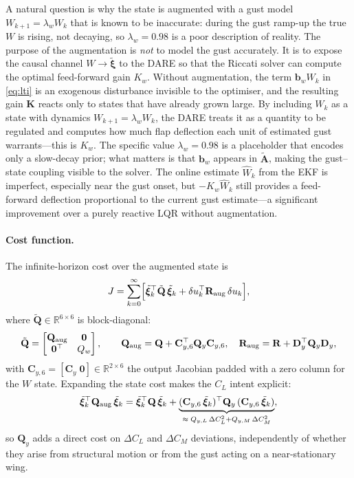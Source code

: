 \documentclass[11pt,a4paper]{article}
\newcommand{\vxi}{\bm{\xi}}
\newcommand{\mA}{\mathbf{A}}
\newcommand{\mC}{\mathbf{C}}
\newcommand{\mD}{\mathbf{D}}
\newcommand{\mK}{\mathbf{K}}
\newcommand{\mQ}{\mathbf{Q}}
\newcommand{\mR}{\mathbf{R}}
\begin{document}
A natural question is why the state is augmented with a gust model
$W_{k+1} = \lambda_w W_k$ that is known to be inaccurate: during the
gust ramp-up the true $W$ is rising, not decaying, so $\lambda_w = 0.98$
is a poor description of reality.
The purpose of the augmentation is \emph{not} to model the gust accurately.
It is to expose the causal channel $W \to \tilde{\vxi}$ to the DARE so
that the Riccati solver can compute the optimal feed-forward gain $K_w$.
Without augmentation, the term $\mathbf{b}_w W_k$ in \eqref{eq:lti} is an
exogenous disturbance invisible to the optimiser, and the resulting gain
$\mK$ reacts only to states that have already grown large.
By including $W_k$ as a state with dynamics $W_{k+1} = \lambda_w W_k$,
the DARE treats it as a quantity to be regulated and computes how much flap
deflection each unit of estimated gust warrants---this is $K_w$.
The specific value $\lambda_w = 0.98$ is a placeholder that encodes only
a slow-decay prior; what matters is that $\mathbf{b}_w$ appears in
$\tilde{\mA}$, making the gust--state coupling visible to the solver.
The online estimate $\hat{W}_k$ from the EKF is imperfect, especially near
the gust onset, but $-K_w \hat{W}_k$ still provides a feed-forward
deflection proportional to the current gust estimate---a significant
improvement over a purely reactive LQR without augmentation.

\paragraph{Cost function.}
The infinite-horizon cost over the augmented state is
\begin{equation}
  J = \sum_{k=0}^{\infty}
      \Bigl[\tilde{\vxi}_k^\top \tilde{\mQ}\,\tilde{\vxi}_k
           + \delta u_k^\top \mR_{\rm aug}\,\delta u_k\Bigr],
  \label{eq:cost}
\end{equation}
where $\tilde{\mQ} \in \mathbb{R}^{6\times6}$ is block-diagonal:
\begin{equation}
  \tilde{\mQ} = \begin{bmatrix} \mQ_{\rm aug} & \mathbf{0} \\ \mathbf{0}^\top & Q_w \end{bmatrix},
  \qquad
  \mQ_{\rm aug} = \mQ + \mC_{y,6}^\top \mQ_y \mC_{y,6},
  \quad
  \mR_{\rm aug} = \mR + \mD_y^\top \mQ_y \mD_y,
  \label{eq:augmented}
\end{equation}
with $\mC_{y,6} = [\mC_y\;\mathbf{0}] \in \mathbb{R}^{2\times6}$ the output
Jacobian padded with a zero column for the $W$ state.
Expanding the state cost makes the $C_L$ intent explicit:
\begin{equation}
  \tilde{\vxi}_k^\top \mQ_{\rm aug}\, \tilde{\vxi}_k
  = \tilde{\vxi}_k^\top \mQ\, \tilde{\vxi}_k
  + \underbrace{(\mC_{y,6}\,\tilde{\vxi}_k)^\top \mQ_y\, (\mC_{y,6}\,\tilde{\vxi}_k)}_{%
      \approx\; Q_{y,L}\,\Delta C_L^2 + Q_{y,M}\,\Delta C_M^2},
  \label{eq:cost_expand}
\end{equation}
so $\mQ_y$ adds a direct cost on $\Delta C_L$ and $\Delta C_M$ deviations,
independently of whether they arise from structural motion or from the gust
acting on a near-stationary wing.
\end{document}
